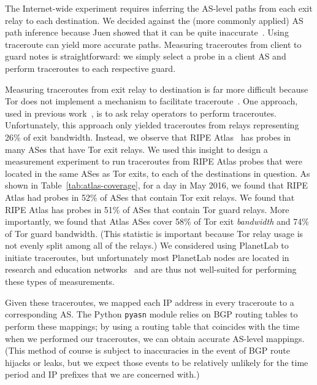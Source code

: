 The Internet-wide experiment requires inferring the AS-level paths from
each exit relay to each destination. We decided against the (more
commonly applied) AS path inference because Juen \ea showed that it can
be quite inaccurate~\cite{Juen2015a}.  Using traceroute can yield more
accurate paths.  Measuring traceroutes from client to guard notes is
straightforward: we simply select a probe in a client AS and perform
traceroutes to each respective guard. %

Measuring traceroutes from exit relay to destination is far more
difficult because Tor does not implement a mechanism to facilitate
traceroute~\cite{Murdoch2007a}.  One approach, used in previous
work~\cite{Juen2015a}, is to ask relay operators to perform traceroutes.
Unfortunately, this approach only yielded traceroutes from relays
representing 26\% of exit bandwidth.  Instead, we observe that RIPE
Atlas~\cite{atlas} has probes in many ASes that have Tor exit relays.
We used this insight to design a measurement experiment to run
traceroutes from RIPE Atlas probes that were located in the same ASes as
Tor exits, to each of the destinations in question.  As shown in
Table~\ref{tab:atlas-coverage}, for a day in May 2016, we found that
RIPE Atlas had probes in 52\% of ASes that contain Tor exit relays.  We
found that RIPE Atlas has probes in 51\% of ASes that contain Tor guard
relays.  More importantly, we found that Atlas ASes cover 58\% of Tor
exit \textit{bandwidth} and 74\% of Tor guard bandwidth. (This statistic
is important because Tor relay usage is not evenly split among all of
the relays.) We considered using PlanetLab to initiate traceroutes, but
unfortunately most PlanetLab nodes are located in research and education
networks~\cite{banerjee2004interdomain} and are thus not well-suited for
performing these types of measurements.

Given these traceroutes, we mapped each IP address in every traceroute
to a corresponding AS.  The Python {\tt pyasn} module relies on BGP
routing tables to perform these mappings; by using a routing table that
coincides with the time when we performed our traceroutes, we can obtain
accurate AS-level mappings.  (This method of course is subject to
inaccuracies in the event of BGP route hijacks or leaks, but we expect
those events to be relatively unlikely for the time period and IP
prefixes that we are concerned with.)



